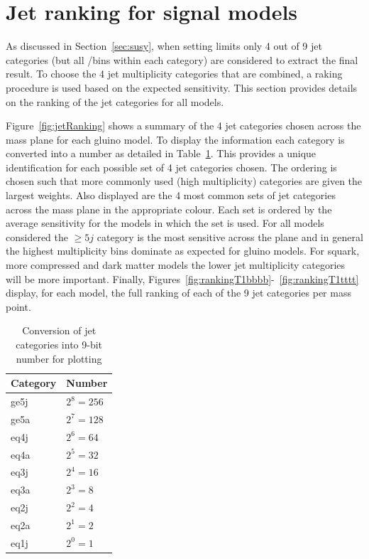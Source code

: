\section{Jet ranking for signal models\label{app:jetRanking}}

As discussed in Section~\ref{sec:susy}, when setting limits only 4 out of 9 jet categories (but all \nb/\scalht bins
within each category) are considered to extract the final result. 
To choose the 4 jet multiplicity categories that are combined, a raking procedure 
is used based on the expected sensitivity. This section provides details on the ranking of the jet
categories for all models.

Figure~\ref{fig:jetRanking} shows a summary of the 4 jet categories chosen across the mass plane for each gluino model.
To display the information each category is converted into a number as detailed in Table~\ref{tab:jetConversion}.
This provides a unique identification for each possible set of 4 jet categories chosen. The ordering
is chosen such that more commonly used (high multiplicity) categories are given the largest weights.
Also displayed are the 4 most common sets of jet categories across the mass plane in the appropriate colour.
Each set is ordered by the average sensitivity for the models in which the set is used. For all models 
considered the $\geq5j$ category is the most sensitive across the plane 
and in general the highest \njet multiplicity bins dominate as expected for gluino models. For squark, 
more compressed and dark matter models the lower jet multiplicity categories will be more important.
Finally, Figures~\ref{fig:rankingT1bbbb}-~\ref{fig:rankingT1tttt} display, for each model, 
the full ranking of each of the 9 jet categories per mass point.

\begin{table}[h!]
\caption{Conversion of jet categories into 9-bit number for plotting}
\label{tab:jetConversion}
\centering
\begin{tabular}{ll}
Category    & Number \\      
\hline \hline
ge5j & $2^{8} = 256$ \\
ge5a & $2^{7} = 128$ \\
eq4j & $2^{6} = 64$  \\
eq4a & $2^{5} = 32$  \\
eq3j & $2^{4} = 16$  \\
eq3a & $2^{3} = 8$   \\
eq2j & $2^{2} = 4$   \\
eq2a & $2^{1} = 2$   \\
eq1j & $2^{0} = 1$   \\
\end{tabular}
\end{table}

